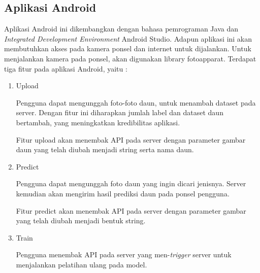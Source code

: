 \subsection{Aplikasi Android}
\par Aplikasi Android ini dikembangkan dengan bahasa pemrograman Java dan \textit{Integrated Development Environment} Android Studio. Adapun aplikasi ini akan membutuhkan akses pada kamera ponsel dan internet untuk dijalankan. Untuk menjalankan kamera pada ponsel, akan digunakan library fotoapparat. Terdapat tiga fitur pada aplikasi Android, yaitu :
\begin {enumerate}
\item Upload
\par Pengguna dapat mengunggah foto-foto daun, untuk menambah dataset pada server. Dengan fitur ini diharapkan jumlah label dan dataset daun bertambah, yang meningkatkan kredibilitas aplikasi. 
\par Fitur upload akan menembak API pada server dengan parameter gambar daun yang telah diubah menjadi string serta nama daun.
\item Predict
\par Pengguna dapat mengunggah foto daun yang ingin dicari jenisnya. Server kemudian akan mengirim hasil prediksi daun pada ponsel pengguna.
\par Fitur predict akan menembak API pada server dengan parameter gambar yang telah diubah menjadi bentuk string.
\item Train
\par Pengguna menembak API pada server yang men-\textit{trigger} server untuk menjalankan pelatihan ulang pada model.
\end {enumerate}

